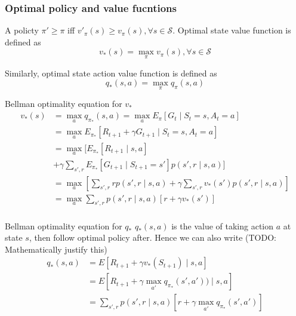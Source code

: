\documentclass[twocolumn, 10pt]{article}
\newcommand{\stateset}{\mathcal{S}}
\begin{document}
\subsubsection*{Optimal policy and value fucntions}

 A policty $\pi' \geq \pi$ iff  $v'_{\pi}(s) \geq v_{\pi}(s), \forall s \in \stateset$. Optimal state value function is defined as $$v_*(s) = \max_{\pi} v_{\pi}(s),  \forall s \in \stateset$$
 
 Similarly,  optimal state action value function is defined as $$ q_*(s, a) = \max_{\pi} q_{\pi}(s, a) $$
   
 Bellman optimality equation for $v_*$  
 $$
\begin{aligned}
v_*(s) & = \max_{a} q_{\pi_*}(s, a) =\max_a E_{\pi} [G_t \mid S_t = s, A_t = a] \\
            & = \max_{a} E_{\pi_*} [R_{t+ 1} + \gamma G_{t+1} \mid S_t = s, A_t = a] \\
            & = \max_{a} [  E_{\pi_*} [R_{t+ 1}  \mid s, a ]  \\
            & + \gamma   \sum_{s', r}  E_{\pi_*} [G_{t+1}  \mid S_{t+1} = s']p(s', r \mid  s, a)]  \\
            & = \max_{a} \left[  \sum_{s', r} r p(s', r \mid s, a)   + \gamma   \sum_{s', r}  v_*(s')p(s', r \mid  s, a) \right]  \\
            & = \max_{a} \sum_{s', r} p(s', r \mid s, a) [r + \gamma v_*(s')] \\
\end{aligned}
$$

Bellman optimality equation for $q_*$
 $q_*(s,a)$ is the value of taking action $a$ at state $s$, then follow optimal policy after. Hence we can also write (TODO: Mathematically justify this)
$$ 
\begin{aligned}
q_*(s, a) & = E[R_{t+1} + \gamma v_*(S_{t+1}) \mid s, a] \\
&= E[R_{t+1} + \gamma  \max_{a'} q_{\pi_*}(s', a')) \mid s, a] \\
&= \sum_{s', r} p(s', r \mid s, a) [ r +\gamma  \max_{a'} q_{\pi_*}(s', a')] \\
\end{aligned}$$
\end{document}
